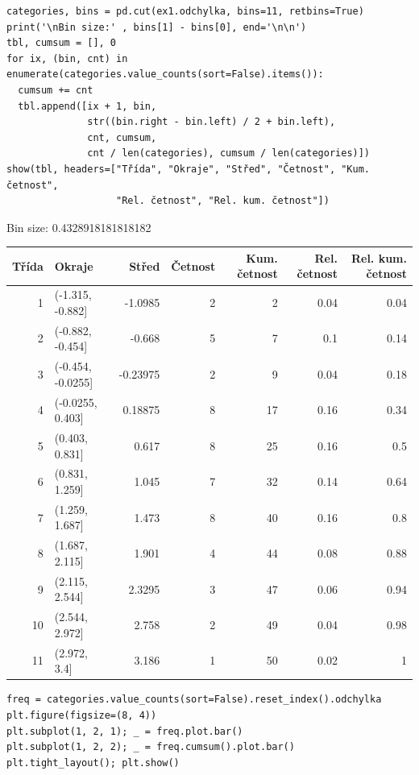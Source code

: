 \documentclass[11pt,titlepage]{article}
\begin{document}
\begin{listing}[htbp]
\begin{verbatim}
categories, bins = pd.cut(ex1.odchylka, bins=11, retbins=True)
print('\nBin size:' , bins[1] - bins[0], end='\n\n')
tbl, cumsum = [], 0
for ix, (bin, cnt) in enumerate(categories.value_counts(sort=False).items()):
  cumsum += cnt
  tbl.append([ix + 1, bin,
              str((bin.right - bin.left) / 2 + bin.left),
              cnt, cumsum,
              cnt / len(categories), cumsum / len(categories)])
show(tbl, headers=["Třída", "Okraje", "Střed", "Četnost", "Kum. četnost",
                   "Rel. četnost", "Rel. kum. četnost"])
\end{verbatim}
\end{listing}



Bin size: 0.4328918181818182

\begin{center}
\begin{tabular}{rlrrrrr}
Třída & Okraje & Střed & Četnost & Kum. četnost & Rel. četnost & Rel. kum. četnost\\
\hline
1 & (-1.315, -0.882] & -1.0985 & 2 & 2 & 0.04 & 0.04\\
2 & (-0.882, -0.454] & -0.668 & 5 & 7 & 0.1 & 0.14\\
3 & (-0.454, -0.0255] & -0.23975 & 2 & 9 & 0.04 & 0.18\\
4 & (-0.0255, 0.403] & 0.18875 & 8 & 17 & 0.16 & 0.34\\
5 & (0.403, 0.831] & 0.617 & 8 & 25 & 0.16 & 0.5\\
6 & (0.831, 1.259] & 1.045 & 7 & 32 & 0.14 & 0.64\\
7 & (1.259, 1.687] & 1.473 & 8 & 40 & 0.16 & 0.8\\
8 & (1.687, 2.115] & 1.901 & 4 & 44 & 0.08 & 0.88\\
9 & (2.115, 2.544] & 2.3295 & 3 & 47 & 0.06 & 0.94\\
10 & (2.544, 2.972] & 2.758 & 2 & 49 & 0.04 & 0.98\\
11 & (2.972, 3.4] & 3.186 & 1 & 50 & 0.02 & 1\\
\end{tabular}
\end{center}

\newpage

\begin{listing}[htbp]
\begin{verbatim}
freq = categories.value_counts(sort=False).reset_index().odchylka
plt.figure(figsize=(8, 4))
plt.subplot(1, 2, 1); _ = freq.plot.bar()
plt.subplot(1, 2, 2); _ = freq.cumsum().plot.bar()
plt.tight_layout(); plt.show()
\end{verbatim}
\end{listing}
\end{document}
